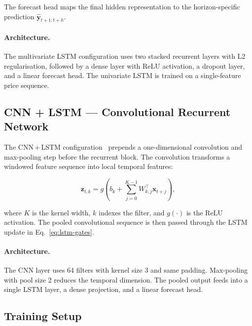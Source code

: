 \documentclass[12pt,a4paper]{article}
\begin{document}
The forecast head maps the final hidden representation to the horizon-specific prediction $\hat{\mathbf{y}}_{t+1:t+h}$.

\paragraph{Architecture.} The multivariate LSTM configuration uses two stacked recurrent layers with L2 regularisation, followed by a dense layer with ReLU activation, a dropout layer, and a linear forecast head. The univariate LSTM is trained on a single-feature price sequence.

\subsection{CNN + LSTM — Convolutional Recurrent Network}

The CNN\,+\,LSTM configuration~\citep{sainath2015convolutional,lecun1998gradient} prepends a one-dimensional convolution and max-pooling step before the recurrent block. The convolution transforms a windowed feature sequence into local temporal features:

\begin{equation}
\mathbf{z}_{t,k} = g\!\left(b_k + \sum_{j=0}^{K-1} W_{k,j}^{\top}\mathbf{x}_{t+j}\right),
\label{eq:conv1d}
\end{equation}

where $K$ is the kernel width, $k$ indexes the filter, and $g(\cdot)$ is the ReLU activation. The pooled convolutional sequence is then passed through the LSTM update in Eq.~\eqref{eq:lstm-gates}.

\paragraph{Architecture.} The CNN layer uses 64 filters with kernel size 3 and same padding. Max-pooling with pool size 2 reduces the temporal dimension. The pooled output feeds into a single LSTM layer, a dense projection, and a linear forecast head.

\subsection{Training Setup}
\end{document}
